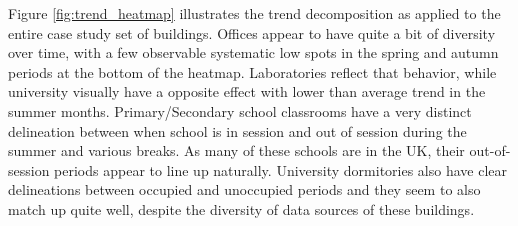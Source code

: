 Figure \ref{fig:trend_heatmap} illustrates the trend decomposition as applied to the entire case study set of buildings. Offices appear to have quite a bit of diversity over time, with a few observable systematic low spots in the spring and autumn periods at the bottom of the heatmap. Laboratories reflect that behavior, while university visually have a opposite effect with lower than average trend in the summer months. Primary/Secondary school classrooms have a very distinct delineation between when school is in session and out of session during the summer and various breaks. As many of these schools are in the UK, their out-of-session periods appear to line up naturally. University dormitories also have clear delineations between occupied and unoccupied periods and they seem to also match up quite well, despite the diversity of data sources of these buildings.